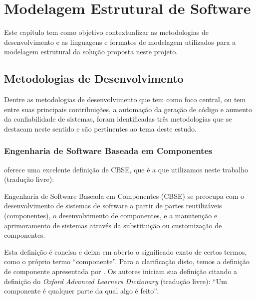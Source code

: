 \chapter{Modelagem Estrutural de Software}
\label{chap:modelagem}

Este capítulo tem como objetivo contextualizar as metodologias de desenvolvimento e as linguagens e formatos de modelagem utilizados para a modelagem estrutural da solução proposta neste projeto.


\section{Metodologias de Desenvolvimento}
\label{chap:metod}

Dentre as metodologias de desenvolvimento que tem como foco central, ou tem entre suas principais contribuições, a automação da geração de código e aumento da confiabilidade de sistemas, foram identificadas três metodologias que se destacam neste sentido e são pertinentes ao tema deste estudo.


\subsection{Engenharia de Software Baseada em Componentes}

 oferece uma excelente definição de CBSE, que é a que utilizamos neste trabalho (tradução livre):

\begin{citacao}
Engenharia de Software Baseada em Componentes (CBSE) se preocupa com o desenvolvimento de sistemas de software a partir de partes reutilizáveis (componentes), o desenvolvimento de componentes, e a manutenção e aprimoramento de sistemas através da substituição ou customização de componentes.
\end{citacao}

Esta definição é concisa e deixa em aberto o significado exato de certos termos, como o próprio termo ``componente''. Para a clarificação disto, temos a definição de componente apresentada por . Os autores iniciam sua definição citando a definição do \textit{Oxford Advanced Learners Dictionary} (tradução livre): ``Um componente é qualquer parte da qual algo é feito''.

